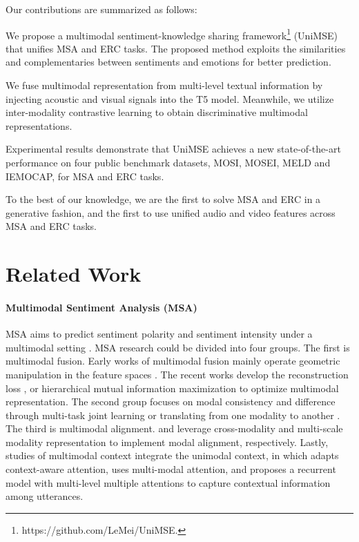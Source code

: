 \documentclass[11pt]{article}
\begin{document}
Our contributions are summarized as follows:
\begin{compactitem}
\item[1.] We propose a multimodal sentiment-knowledge sharing framework\footnote{https://github.com/LeMei/UniMSE.} (UniMSE) that unifies MSA and ERC tasks. The proposed method exploits the similarities and complementaries between sentiments and emotions for better prediction.

\item[2.] We fuse multimodal representation from multi-level textual information by injecting acoustic and visual signals into the T5 model. Meanwhile, we utilize inter-modality contrastive learning to obtain discriminative multimodal representations.

\item[3.] Experimental results demonstrate that UniMSE achieves a new state-of-the-art performance on four public benchmark datasets, MOSI, MOSEI, MELD and IEMOCAP, for MSA and ERC tasks. 

\item[4.] To the best of our knowledge, we are the first to solve MSA and ERC in a generative fashion, and the first to use unified audio and video features across MSA and ERC tasks. \end{compactitem}

\section{Related Work}
\paragraph{Multimodal Sentiment Analysis (MSA)} 
MSA aims to predict sentiment polarity and sentiment intensity under a multimodal setting \cite{DBLP:conf/icmi/MorencyMD11}. MSA research could be divided into four groups. The first is multimodal fusion. Early works of multimodal fusion mainly operate geometric manipulation in the feature spaces \cite{DBLP:conf/emnlp/ZadehCPCM17}. The recent works develop the reconstruction loss \cite{DBLP:conf/mm/HazarikaZP20}, or hierarchical mutual information maximization \cite{DBLP:conf/emnlp/HanCP21} to optimize multimodal representation. The second group focuses on modal consistency and difference through multi-task joint learning \cite{DBLP:conf/aaai/YuXYW21} or translating from one modality to another \cite{DBLP:conf/aaai/Mai0X20}. 
The third is multimodal alignment. \citet{DBLP:conf/acl/TsaiBLKMS19} and \citet{DBLP:journals/corr/abs-2112-01368} leverage cross-modality and multi-scale modality representation to implement modal alignment, respectively. Lastly, studies of multimodal context integrate the unimodal context, in which \citet{DBLP:conf/emnlp/ChauhanAEB19} adapts context-aware attention, \citet{DBLP:conf/emnlp/GhosalACPEB18} uses multi-modal attention, and \citet{DBLP:conf/icdm/PoriaCHMZM17} proposes a recurrent model with multi-level multiple attentions to capture contextual information among utterances. 
\end{document}
